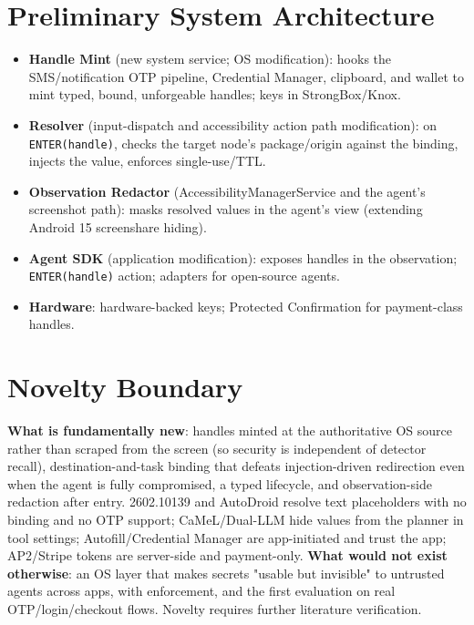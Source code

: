 \documentclass[11pt]{article}
\begin{document}
\section{Preliminary System Architecture}
\begin{itemize}
  \item \textbf{Handle Mint} (new system service; OS modification): hooks the SMS/notification OTP pipeline, Credential Manager, clipboard, and wallet to mint typed, bound, unforgeable handles; keys in StrongBox/Knox.
  \item \textbf{Resolver} (input-dispatch and accessibility action path modification): on \texttt{ENTER(handle)}, checks the target node's package/origin against the binding, injects the value, enforces single-use/TTL.
  \item \textbf{Observation Redactor} (AccessibilityManagerService and the agent's screenshot path): masks resolved values in the agent's view (extending Android 15 screenshare hiding).
  \item \textbf{Agent SDK} (application modification): exposes handles in the observation; \texttt{ENTER(handle)} action; adapters for open-source agents.
  \item \textbf{Hardware}: hardware-backed keys; Protected Confirmation for payment-class handles.
\end{itemize}

\section{Novelty Boundary}
\textbf{What is fundamentally new}: handles minted at the authoritative OS source rather than scraped from the screen (so security is independent of detector recall), destination-and-task binding that defeats injection-driven redirection even when the agent is fully compromised, a typed lifecycle, and observation-side redaction after entry. 2602.10139 and AutoDroid resolve text placeholders with no binding and no OTP support; CaMeL/Dual-LLM hide values from the planner in tool settings; Autofill/Credential Manager are app-initiated and trust the app; AP2/Stripe tokens are server-side and payment-only. \textbf{What would not exist otherwise}: an OS layer that makes secrets "usable but invisible" to untrusted agents across apps, with enforcement, and the first evaluation on real OTP/login/checkout flows. Novelty requires further literature verification.
\end{document}
